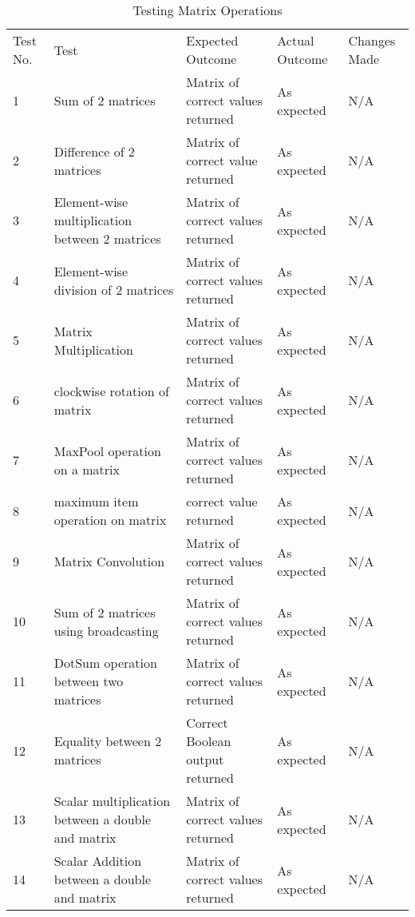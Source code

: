 \begin{table}[H]
\centering
    \begin{tabular}{|p{1cm}|p{4cm}|p{4cm}|p{3cm}|p{2cm}|}
        \hline
        Test No. & Test & Expected Outcome & Actual Outcome & Changes Made \\ \cline{1-5} 
        1 & Sum of 2 matrices & Matrix of correct values returned & As expected & N/A \\
        \cline{1-5}
        2 & Difference of 2 matrices & Matrix of correct value returned & As expected & N/A \\
        \cline{1-5}
        3 & Element-wise multiplication between 2 matrices & Matrix of correct values returned & As expected & N/A \\
        \cline{1-5}
        4 & Element-wise division of 2 matrices & Matrix of correct values returned & As expected & N/A \\
        \cline{1-5}
        5 & Matrix Multiplication & Matrix of correct values returned & As expected & N/A \\
        \cline{1-5}
        6 & clockwise rotation of matrix & Matrix of correct values returned & As expected & N/A \\
        \cline{1-5}
        7 & MaxPool operation on a matrix & Matrix of correct values returned & As expected & N/A \\
        \cline{1-5}
        8 & maximum item operation on matrix & correct value returned & As expected & N/A \\
        \cline{1-5}
        9 & Matrix Convolution & Matrix of correct values returned & As expected & N/A \\
        \cline{1-5}
        10 & Sum of 2 matrices using broadcasting & Matrix of correct values returned & As expected & N/A \\
        \cline{1-5}
        11 & DotSum operation between two matrices & Matrix of correct values returned & As expected & N/A \\
        \cline{1-5}
        12 & Equality between 2 matrices & Correct Boolean output returned & As expected & N/A \\
        \cline{1-5}
        13 & Scalar multiplication between a double and matrix & Matrix of correct values returned & As expected & N/A \\
        \cline{1-5}
        14 & Scalar Addition between a double and matrix & Matrix of correct values returned & As expected & N/A \\
        \cline{1-5}
    \end{tabular}
    \caption{Testing Matrix Operations}
    \vspace{0.5cm}
\end{table}

